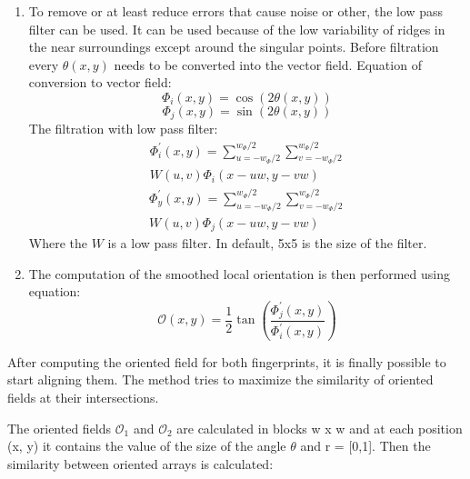 \begin{enumerate}
	\item To remove or at least reduce errors that cause noise or other, the low pass filter can be used. It can be used because of the low variability of ridges in the near surroundings except around the singular points. Before filtration every $\theta(x, y)$ needs to be converted into the vector field. Equation of conversion to vector field:\cite{ori}
    \begin{equation}
         \Phi_{i}(x, y)=\cos (2 \theta(x, y))
    \end{equation}   
    \begin{equation}
         \Phi_{j}(x, y)=\sin (2 \theta(x, y))
     \end{equation}\cite{ori}
     The filtration with low pass filter:\cite{ori}
     \begin{equation}
         \begin{split}
             \Phi_{i}^{\prime}(x, y)= \sum_{u=-w_{\Phi} / 2}^{w_{\Phi} / 2} \sum_{v=-w_{\Phi} / 2}^{w_{\Phi} / 2} \\ W(u, v) \Phi_{i}(x-u w, y-v w)
        \end{split}
     \end{equation}
     \begin{equation}
        \begin{split}
             \Phi_{y}^{\prime}(x, y)=\sum_{u=-w_{\Phi} / 2}^{w_{\Phi} / 2} \sum_{v=-w_{\Phi} / 2}^{w_{\Phi} / 2} \\ W(u, v) \Phi_{j}(x-u w, y-v w)
        \end{split}
     \end{equation}
	Where the $W$ is a low pass filter. In default, 5x5 is the size of the filter.   
	
     \item 
     The computation of the smoothed local orientation is then performed using equation:
      \begin{equation}
        \mathcal{O}(x, y)=\frac{1}{2} \tan \left(\frac{\Phi_{j}^{\prime}(x, y)}{\Phi_{i}^{\prime}(x, y)}\right)
     \end{equation}
\end{enumerate}\cite{ori}

After computing the oriented field for both fingerprints, it is finally possible to start aligning them. The method tries to maximize the similarity of oriented fields at their intersections.

The oriented fields $ \mathcal{O}_1 $ and $ \mathcal{O}_2 $ are calculated in blocks w x w and at each position (x, y) it contains the value of the size of the angle $ \theta $ and r = [0,1]. Then the similarity between oriented arrays is calculated: \cite{morphing_paper} 	

